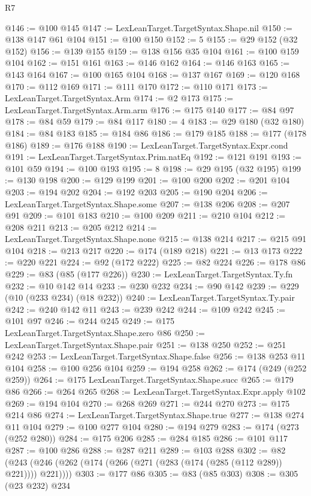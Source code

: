 \begin{lexlean}{R7}
\begin{coremodule}
@146 := @100 @145
@147 := LexLeanTarget.TargetSyntax.Shape.nil
@150 := @138 @147 @61 @104
@151 := @100 @150
@152 := 5
@155 := @29 @152 (@32 @152)
@156 := @139 @155
@159 := @138 @156 @35 @104
@161 := @100 @159 @104
@162 := @151 @161
@163 := @146 @162
@164 := @146 @163
@165 := @143 @164
@167 := @100 @165 @104
@168 := @137 @167
@169 := @120 @168
@170 := @112 @169
@171 := @111 @170
@172 := @110 @171
@173 := LexLeanTarget.TargetSyntax.Arm
@174 := @2 @173
@175 := LexLeanTarget.TargetSyntax.Arm.arm
@176 := @175 @140
@177 := @84 @97
@178 := @84 @59
@179 := @84 @117
@180 := 4
@183 := @29 @180 (@32 @180)
@184 := @84 @183
@185 := @184 @86
@186 := @179 @185
@188 := @177 (@178 @186)
@189 := @176 @188
@190 := LexLeanTarget.TargetSyntax.Expr.cond
@191 := LexLeanTarget.TargetSyntax.Prim.natEq
@192 := @121 @191
@193 := @101 @59
@194 := @100 @193
@195 := 8
@198 := @29 @195 (@32 @195)
@199 := @130 @198
@200 := @129 @199
@201 := @100 @200
@202 := @201 @104
@203 := @194 @202
@204 := @192 @203
@205 := @190 @204
@206 := LexLeanTarget.TargetSyntax.Shape.some
@207 := @138 @206
@208 := @207 @91
@209 := @101 @183
@210 := @100 @209
@211 := @210 @104
@212 := @208 @211
@213 := @205 @212
@214 := LexLeanTarget.TargetSyntax.Shape.none
@215 := @138 @214
@217 := @215 @91 @104
@218 := @213 @217
@220 := @174 (@189 @218)
@221 := @13 @173
@222 := @220 @221
@224 := @92 (@172 @222)
@225 := @82 @224
@226 := @178 @86
@229 := @83 (@85 (@177 @226))
@230 := LexLeanTarget.TargetSyntax.Ty.fn
@232 := @10 @142 @14
@233 := @230 @232
@234 := @90 @142
@239 := @229 (@10 (@233 @234) (@18 @232))
@240 := LexLeanTarget.TargetSyntax.Ty.pair
@242 := @240 @142 @11
@243 := @239 @242
@244 := @109 @242
@245 := @101 @97
@246 := @244 @245
@249 := @175 LexLeanTarget.TargetSyntax.Shape.zero @86
@250 := LexLeanTarget.TargetSyntax.Shape.pair
@251 := @138 @250
@252 := @251 @242
@253 := LexLeanTarget.TargetSyntax.Shape.false
@256 := @138 @253 @11 @104
@258 := @100 @256 @104
@259 := @194 @258
@262 := @174 (@249 (@252 @259))
@264 := @175 LexLeanTarget.TargetSyntax.Shape.succ
@265 := @179 @86
@266 := @264 @265
@268 := LexLeanTarget.TargetSyntax.Expr.apply @102
@269 := @194 @104
@270 := @268 @269
@271 := @244 @270
@273 := @175 @214 @86
@274 := LexLeanTarget.TargetSyntax.Shape.true
@277 := @138 @274 @11 @104
@279 := @100 @277 @104
@280 := @194 @279
@283 := @174 (@273 (@252 @280))
@284 := @175 @206
@285 := @284 @185
@286 := @101 @117
@287 := @100 @286
@288 := @287 @211
@289 := @103 @288
@302 := @82 (@243 (@246 (@262 (@174 (@266 (@271 (@283 (@174 (@285 (@112 @289)) @221)))) @221))))
@303 := @177 @86
@305 := @83 (@85 @303)
@308 := @305 (@23 @232) @234

\end{coremodule}
\end{lexlean}
